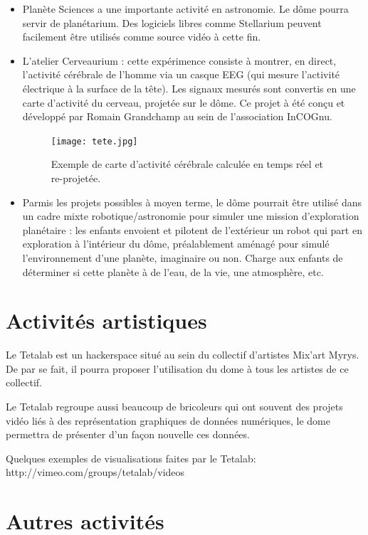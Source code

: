 \documentclass[a4paper,12pt]{report}
\begin{document}
\begin{itemize}
	\item Planète Sciences a une importante activité en astronomie. Le dôme
	pourra servir de planétarium. Des logiciels libres comme Stellarium peuvent
	facilement être utilisés comme source vidéo à cette fin.

	\item L'atelier Cerveaurium : cette expérimence consiste à montrer, en
	direct, l'activité cérébrale de l'homme via un casque EEG (qui mesure
	l'activité électrique à la surface de la tête). Les signaux mesurés sont
	convertis en une carte d'activité du cerveau, projetée sur le dôme. Ce
	projet à été conçu et développé par Romain Grandchamp au sein de
	l'association InCOGnu.

    \begin{figure}[!h]
    \centering
    \texttt{[image: tete.jpg]}
	\caption{Exemple de carte d'activité cérébrale calculée en temps réel et re-projetée.}
    \end{figure}


	\item Parmis les projets possibles à moyen terme, le dôme pourrait être
	utilisé dans un cadre mixte robotique/astronomie pour simuler une mission
	d'exploration planétaire : les enfants envoient et pilotent de l'extérieur
	un robot qui part en exploration à l'intérieur du dôme, préalablement
	aménagé pour simulé l'environnement d'une planète, imaginaire ou non.
	Charge aux enfants de déterminer si cette planète à de l'eau, de la vie,
	une atmosphère, etc.

\end{itemize}

\section{Activités artistiques}

Le Tetalab est un hackerspace situé au sein du collectif d'artistes Mix'art Myrys.
De par se fait, il pourra proposer l'utilisation du dome à tous les artistes de ce 
collectif.

Le Tetalab regroupe aussi beaucoup de bricoleurs qui ont souvent des projets vidéo
liés à des représentation graphiques de données numériques, le dome permettra de 
présenter d'un façon nouvelle ces données.

Quelques exemples de visualisations faites par le Tetalab: http://vimeo.com/groups/tetalab/videos


\section{Autres activités}
\end{document}
